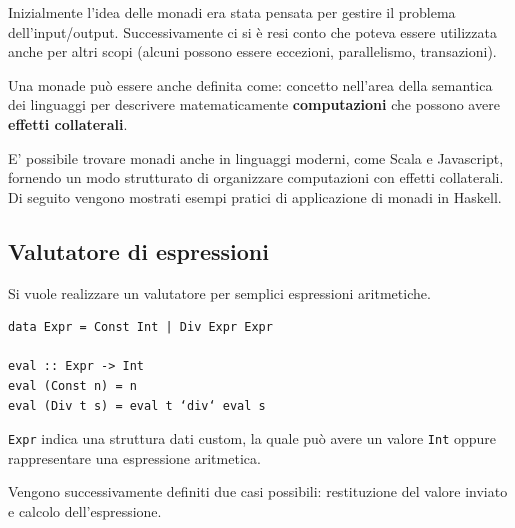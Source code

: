 \documentclass{article}
\begin{document}
Inizialmente l'idea delle monadi era stata pensata per gestire il problema dell'input/output. Successivamente ci si è resi conto che poteva essere utilizzata anche per altri scopi (alcuni possono essere eccezioni, parallelismo, transazioni).

Una monade può essere anche definita come: concetto nell’area della semantica dei linguaggi per descrivere matematicamente \textbf{computazioni} che possono avere \textbf{effetti collaterali}.

E' possibile trovare monadi anche in linguaggi moderni, come Scala e Javascript, fornendo un modo strutturato di organizzare computazioni con effetti collaterali.\vspace{14pt}\\
Di seguito vengono mostrati esempi pratici di applicazione di monadi in Haskell.

\pagebreak

\subsection*{Valutatore di espressioni}
Si vuole realizzare un valutatore per semplici espressioni aritmetiche.
\begin{tcolorbox}
\begin{verbatim}
data Expr = Const Int | Div Expr Expr

eval :: Expr -> Int
eval (Const n) = n
eval (Div t s) = eval t ‘div‘ eval s
\end{verbatim}
\end{tcolorbox}
\texttt{Expr} indica una struttura dati custom, la quale può avere un valore \texttt{Int} oppure rappresentare una espressione aritmetica.

Vengono successivamente definiti due casi possibili: restituzione del valore inviato e calcolo dell'espressione.
\end{document}
